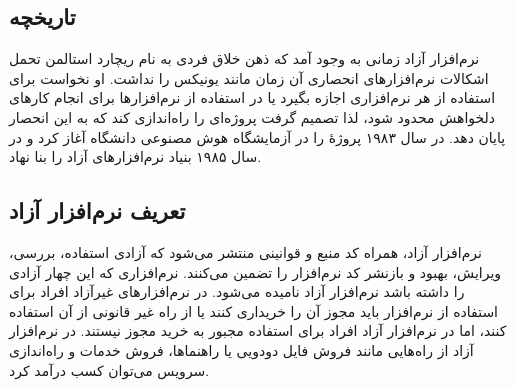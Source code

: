 \documentclass{article}
\begin{document}
\subsection{تاریخچه}
نرم‌افزار آزاد زمانی به وجود آمد که ذهن خلاق فردی به نام ریچارد استالمن تحمل اشکالات نرم‌افزارهای انحصاری آن زمان مانند یونیکس را نداشت. او نخواست برای استفاده از هر نرم‌افزاری اجازه بگیرد یا در استفاده از نرم‌افزارها برای انجام کار‌های دلخواهش محدود شود، لذا تصمیم گرفت پروژه‌ای را راه‌اندازی کند که به این انحصار پایان دهد. در سال ۱۹۸۳ پروژهٔ  را در آزمایشگاه هوش مصنوعی دانشگاه  آغاز کرد و در سال ۱۹۸۵ بنیاد نرم‌افزار‌های آزاد را بنا نهاد.

\subsection{تعریف نرم‌افزار آزاد}
نرم‌افزار آزاد، همراه کد منبع و قوانینی منتشر می‌شود که آزادی استفاده، بررسی، ویرایش، بهبود و بازنشر کد نرم‌افزار را تضمین می‌کنند. نرم‌افزاری که این چهار آزادی را داشته باشد نرم‌افزار آزاد نامیده می‌شود. در نرم‌افزارهای غیرآزاد افراد برای استفاده از نرم‌افزار باید مجوز آن را خریداری کنند یا از راه غیر قانونی از آن استفاده کنند، اما در نرم‌افزار آزاد افراد برای استفاده مجبور به خرید مجوز نیستند. در نرم‌افزار آزاد از راه‌هایی مانند فروش فایل دودویی یا راهنماها، فروش خدمات و راه‌اندازی سرویس می‌توان کسب درآمد کرد.
\end{document}

